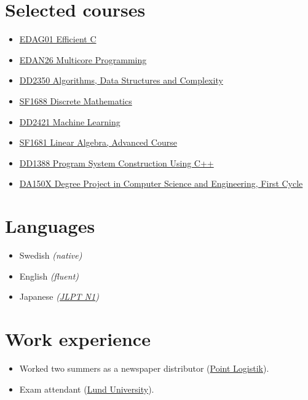 \documentclass[11pt]{article}
\begin{document}
\section{Selected courses}
\vspace*{-14pt}
\begin{multicols}{2}
\begin{itemize}
    \item \href{https://kurser.lth.se/lot/course-syllabus-en/23_24/EDAG01}{EDAG01 Efficient C}
    \item \href{https://kurser.lth.se/lot/course-syllabus-en/24_25/EDAN26}{EDAN26 Multicore Programming}
    \item \href{https://www.kth.se/student/kurser/kurs/DD2350?l=en}{DD2350 Algorithms, Data Structures and Complexity}
    \item \href{https://www.kth.se/student/kurser/kurs/SF1688?l=en}{SF1688 Discrete Mathematics}
    \item \href{https://www.kth.se/student/kurser/kurs/DD2421?l=en}{DD2421 Machine Learning}
    \item \href{https://www.kth.se/student/kurser/kurs/SF1681?l=en}{SF1681 Linear Algebra, Advanced Course}
    \item \href{https://www.kth.se/student/kurser/kurs/DD1388?l=en}{DD1388 Program System Construction Using C++}
    \item \href{https://www.kth.se/student/kurser/kurs/DA150X?l=en}{DA150X Degree Project in Computer Science and Engineering, First Cycle}
\end{itemize}
\end{multicols}

\section{Languages}
\begin{itemize}
    \item Swedish \textit{(native)}
    \item English \textit{(fluent)}
    \item Japanese \textit{(\href{https://www.jlpt.jp/e/about/levelsummary.html}{JLPT N1})}
\end{itemize}

\section{Work experience}
\begin{itemize}
    \item Worked two summers as a newspaper distributor (\href{https://www.pointlogistik.se/}{Point Logistik}).
    \item Exam attendant (\href{https://www.lth.se/english/}{Lund University}).
\end{itemize}
\end{document}
